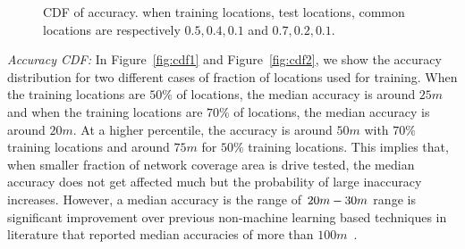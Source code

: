 \documentclass[conference, 10pt]{IEEEtran}
\begin{document}
\begin{figure}[t]
\begin{center}
\caption{CDF of accuracy.\label{fig:leapperf} when training locations, test
locations, common locations are respectively $0.5,0.4,0.1$ and $0.7,0.2,0.1$.}
\end{center}
\end{figure}

{\em Accuracy CDF:} In Figure~\ref{fig:cdf1} and Figure~\ref{fig:cdf2}, we show the
accuracy distribution for two different cases of fraction of locations used for
training. When the training locations are $50\%$ of locations, the median accuracy is around
$25m$ and when the training locations are $70\%$ of locations, the median accuracy is
around $20m$. At a higher percentile, the accuracy is around $50m$ with $70\%$
training locations and around $75m$ for $50\%$ training locations. This implies that,
when smaller fraction of network coverage area is drive tested, the median accuracy
does not get affected much but the probability of large inaccuracy increases.
However, a median accuracy is the range of $20m\--30m$ range is significant
improvement over previous non-machine learning based techniques in literature that
reported median accuracies of more than $100m$~\cite{Flananghan07PCMD}.
\end{document}
